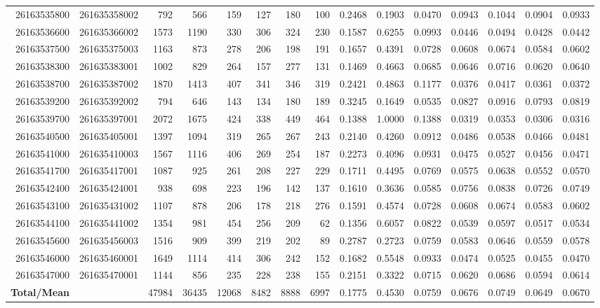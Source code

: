 \documentclass[11pt]{article}
\begin{document}
\begin{landscape}
\begin{longtable}{r|r|r|r|r|r|r|r|r|r|r|r|r|r|r}
26163535800 & 261635358002 & 792 & 566 & 159 & 127 & 180 & 100 & 0.2468 & 0.1903 & 0.0470 & 0.0943 & 0.1044 & 0.0904 & 0.0933 \\
26163536600 & 261635366002 & 1573 & 1190 & 330 & 306 & 324 & 230 & 0.1587 & 0.6255 & 0.0993 & 0.0446 & 0.0494 & 0.0428 & 0.0442 \\
26163537500 & 261635375003 & 1163 & 873 & 278 & 206 & 198 & 191 & 0.1657 & 0.4391 & 0.0728 & 0.0608 & 0.0674 & 0.0584 & 0.0602 \\
26163538300 & 261635383001 & 1002 & 829 & 264 & 157 & 277 & 131 & 0.1469 & 0.4663 & 0.0685 & 0.0646 & 0.0716 & 0.0620 & 0.0640 \\
26163538700 & 261635387002 & 1870 & 1413 & 407 & 341 & 346 & 319 & 0.2421 & 0.4863 & 0.1177 & 0.0376 & 0.0417 & 0.0361 & 0.0372 \\
26163539200 & 261635392002 & 794 & 646 & 143 & 134 & 180 & 189 & 0.3245 & 0.1649 & 0.0535 & 0.0827 & 0.0916 & 0.0793 & 0.0819 \\
26163539700 & 261635397001 & 2072 & 1675 & 424 & 338 & 449 & 464 & 0.1388 & 1.0000 & 0.1388 & 0.0319 & 0.0353 & 0.0306 & 0.0316 \\
26163540500 & 261635405001 & 1397 & 1094 & 319 & 265 & 267 & 243 & 0.2140 & 0.4260 & 0.0912 & 0.0486 & 0.0538 & 0.0466 & 0.0481 \\
26163541000 & 261635410003 & 1567 & 1116 & 406 & 269 & 254 & 187 & 0.2273 & 0.4096 & 0.0931 & 0.0475 & 0.0527 & 0.0456 & 0.0471 \\
26163541700 & 261635417001 & 1087 & 925 & 261 & 208 & 227 & 229 & 0.1711 & 0.4495 & 0.0769 & 0.0575 & 0.0638 & 0.0552 & 0.0570 \\
26163542400 & 261635424001 & 938 & 698 & 223 & 196 & 142 & 137 & 0.1610 & 0.3636 & 0.0585 & 0.0756 & 0.0838 & 0.0726 & 0.0749 \\
26163543100 & 261635431002 & 1107 & 878 & 206 & 178 & 218 & 276 & 0.1591 & 0.4574 & 0.0728 & 0.0608 & 0.0674 & 0.0583 & 0.0602 \\
26163544100 & 261635441002 & 1354 & 981 & 454 & 256 & 209 & 62 & 0.1356 & 0.6057 & 0.0822 & 0.0539 & 0.0597 & 0.0517 & 0.0534 \\
26163545600 & 261635456003 & 1516 & 909 & 399 & 219 & 202 & 89 & 0.2787 & 0.2723 & 0.0759 & 0.0583 & 0.0646 & 0.0559 & 0.0578 \\
26163546000 & 261635460001 & 1649 & 1114 & 414 & 306 & 242 & 152 & 0.1682 & 0.5548 & 0.0933 & 0.0474 & 0.0525 & 0.0455 & 0.0470 \\
26163547000 & 261635470001 & 1144 & 856 & 235 & 228 & 238 & 155 & 0.2151 & 0.3322 & 0.0715 & 0.0620 & 0.0686 & 0.0594 & 0.0614 \\
\midrule
\textbf{Total/Mean} & & 47984 & 36435 & 12068 & 8482 & 8888 & 6997 & 0.1775 & 0.4530 & 0.0759 & 0.0676 & 0.0749 & 0.0649 & 0.0670 \\

\end{longtable}
\end{landscape}
\end{document}

